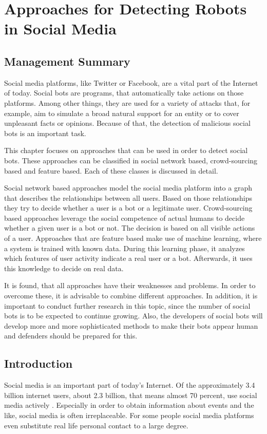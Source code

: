 \newpage
\chapter{Approaches for Detecting Robots \\ in Social Media}

\section*{Management Summary}
Social media platforms, like Twitter or Facebook, are a vital part of the Internet of today. Social bots are programs, that automatically take actions on those platforms. Among other things, they are used for a variety of attacks that, for example, aim to simulate a broad natural support for an entity or to cover unpleasant facts or opinions. Because of that, the detection of malicious social bots is an important task.

This chapter focuses on approaches that can be used in order to detect social bots. These approaches can be classified in social network based, crowd-sourcing based and feature based. Each of these classes is discussed in detail.

Social network based approaches model the social media platform into a graph that describes the relationships between all users. Based on those relationships they try to decide whether a user is a bot or a legitimate user.
Crowd-sourcing based approaches leverage the social competence of actual humans to decide whether a given user is a bot or not. The decision is based on all visible actions of a user. 
Approaches that are feature based make use of machine learning, where a system is trained with known data. During this learning phase, it analyzes which features of user activity indicate a real user or a bot. Afterwards, it uses this knowledge to decide on real data.

It is found, that all approaches have their weaknesses and problems. In order to overcome these, it is advisable to combine different approaches. In addition, it is important to conduct further research in this topic, since the number of social bots is to be expected to continue growing. Also, the developers of social bots will develop more and more sophisticated methods to make their bots appear human and defenders should be prepared for this. 


\newpage
\section{Introduction}
Social media is an important part of today's Internet.  Of the approximately 3.4 billion internet users, about 2.3 billion, that means almost 70 percent, use social media actively \cite{insight}. Especially in order to obtain information about events and the like, social media is often irreplaceable.  For some people social media platforms even substitute real life personal contact to a large degree.

